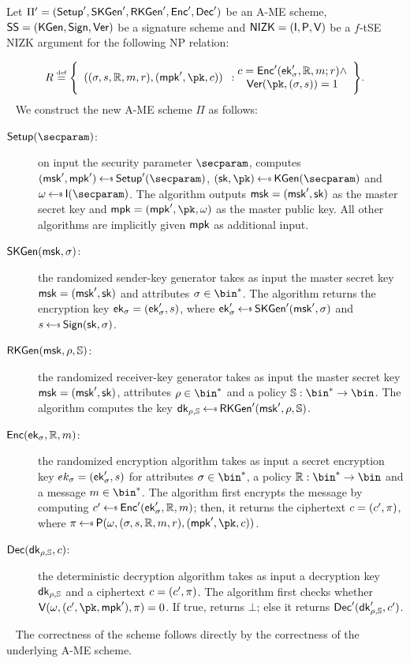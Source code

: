 \begin{construction}\label{constr:ame_nizk}
    Let $\Pi'=(\mathsf{Setup}',\mathsf{SKGen}',\mathsf{RKGen}', \mathsf{Enc}',\mathsf{Dec}')$ be an A-ME scheme, $\mathsf{SS} =(\mathsf{KGen},\mathsf{Sign},\mathsf{Ver})$ be a signature scheme and $\mathsf{NIZK}=(\mathsf{I}, \mathsf{P}, \mathsf{V})$ be a $f$-tSE NIZK argument for the following NP relation:

    \[
        R \eqdef \Biggl\{ \begin{array}{c}((\sattr, \signature, \raccess, \msg, r),(\mpk', \pk, \cipher))\end{array}:\begin{array}{@{}c}
            \cipher = \enc'(\ek'_\sattr, \raccess, \msg; r) \land \\
            \ver(\pk, (\sattr, \signature)) = 1
        \end{array} \Biggr\}.
    \]
    ~\newline\newline
    We construct the new A-ME scheme $\Pi$ as follows:
    \begin{description}
        \item[$\setup(\secparam)$:] on input the security parameter $\secparam$, computes $(\msk', \mpk') \getsr \setup'(\secparam)$, $(\sk, \pk) \getsr \kgen(\secparam)$ and $\crs \getsr \init(\secparam)$. The algorithm outputs $\mathsf{msk} = (\mathsf{msk}', \mathsf{sk})$ as the master secret key and $\mpk = (\mpk', \pk, \crs)$ as the master public key. All other algorithms are implicitly given $\mathsf{mpk}$ as additional input.
        \item[$\mathsf{SKGen}(\mathsf{msk}, \sigma)$:] the randomized sender-key generator takes as input the master secret key $\mathsf{msk} = (\mathsf{msk}', \mathsf{sk})$ and attributes $\sattr \in \bin^*$. The algorithm returns the encryption key $\mathsf{ek}_\sigma = (\mathsf{ek}'_\sigma, s)$, where $\ek'_\sattr \getsr \skgen'(\msk', \sattr)$ and $\signature \getsr \sign(\sk, \sattr)$.
        \item[$\mathsf{RKGen}(\mathsf{msk}, \rho, \mathbb{S})$:] the randomized receiver-key generator takes as input the master secret key $\mathsf{msk} = (\mathsf{msk}', \mathsf{sk})$, attributes $\rattr \in \bin^*$ and a policy $\saccess:\bin^* \to \bin$. The algorithm computes the key $\dk_{\rattr, \saccess} \getsr \rkgen'(\msk', \rattr, \saccess)$.
        \item[$\mathsf{Enc}(\mathsf{ek}_\sigma, \mathbb{R}, m)$:] the randomized encryption algorithm takes as input a secret encryption key $ek_\sigma = (\mathsf{ek}'_\sigma, s)$ for attributes $\sattr \in \bin^*$, a policy $\raccess: \bin^* \to \bin$ and a message $\msg \in \bin^*$. The algorithm first encrypts the message by computing $\cipher' \getsr \enc'(\ek'_\sattr, \raccess, \msg)$; then, it returns the ciphertext $c = (c', \pi)$, where $\pi \getsr \prover(\crs, (\sattr, \signature, \raccess, \msg, r),(\mpk', \pk, \cipher))$.
        \item[$\mathsf{Dec}(\mathsf{dk}_{\rho, \mathbb{S}}, c)$:] the deterministic decryption algorithm takes as input a decryption key $\mathsf{dk}_{\rho, \mathbb{S}}$ and a ciphertext $c = (c', \pi)$. The algorithm first checks whether $\verifier(\crs, (\cipher', \pk, \mpk'), \pi) = 0$. If true, returns $\bot$; else it returns $\mathsf{Dec}'(\mathsf{dk}'_{\rho, \mathbb{S}}, c')$.
    \end{description}
\end{construction}
~\newline
The correctness of the scheme follows directly by the correctness of the underlying A-ME scheme.